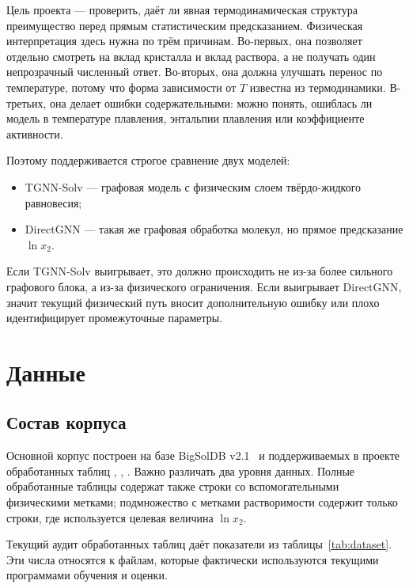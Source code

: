 \documentclass[11pt]{article}
\DeclareRobustCommand{\code}[1]{\texttt{\detokenize{#1}}}
\theoremstyle{definition}
\begin{document}
Цель проекта --- проверить, даёт ли явная термодинамическая структура преимущество перед прямым статистическим предсказанием. Физическая интерпретация здесь нужна по трём причинам. Во-первых, она позволяет отдельно смотреть на вклад кристалла и вклад раствора, а не получать один непрозрачный численный ответ. Во-вторых, она должна улучшать перенос по температуре, потому что форма зависимости от $T$ известна из термодинамики. В-третьих, она делает ошибки содержательными: можно понять, ошиблась ли модель в температуре плавления, энтальпии плавления или коэффициенте активности.

Поэтому поддерживается строгое сравнение двух моделей:
\begin{itemize}
    \item TGNN-Solv --- графовая модель с физическим слоем твёрдо-жидкого равновесия;
    \item DirectGNN --- такая же графовая обработка молекул, но прямое предсказание $\ln x_2$.
\end{itemize}
Если TGNN-Solv выигрывает, это должно происходить не из-за более сильного графового блока, а из-за физического ограничения. Если выигрывает DirectGNN, значит текущий физический путь вносит дополнительную ошибку или плохо идентифицирует промежуточные параметры.

\section{Данные}

\subsection{Состав корпуса}

Основной корпус построен на базе BigSolDB v2.1~\cite{krasnov2025,bigsoldb2026} и поддерживаемых в проекте обработанных таблиц \code{train.csv}, \code{val.csv}, \code{test.csv}. Важно различать два уровня данных. Полные обработанные таблицы содержат также строки со вспомогательными физическими метками; подмножество с метками растворимости содержит только строки, где используется целевая величина $\ln x_2$.

Текущий аудит обработанных таблиц даёт показатели из таблицы~\ref{tab:dataset}. Эти числа относятся к файлам, которые фактически используются текущими программами обучения и оценки.
\end{document}
